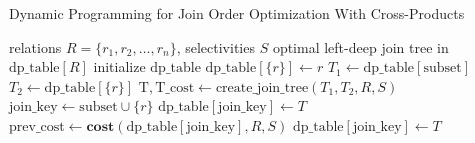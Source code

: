 \begin{algorithm}
\caption{Dynamic Programming for Join Order Optimization With Cross-Products}
\label{alg:dp-join-order}
\begin{algorithmic}[1]
\Require relations $R = \{r_1, r_2, \dots, r_n\}$, selectivities $S$
\Ensure optimal left-deep join tree in $\text{dp\_table}[R]$
\State initialize $\text{dp\_table}$
    \State $\text{dp\_table}[\{r\}] \gets r$ 
\EndFor
{} 
             
                \State $T_1 \gets \text{dp\_table}[\text{subset}]$
                \State $T_2 \gets \text{dp\_table}[\{r\}]$
                \State $\text{T}, \text{T\_cost} \gets \text{create\_join\_tree}(T_1, T_2, R, S)$
                \State $\text{join\_key} \gets \text{subset} \cup \{r\}$
                    \State $\text{dp\_table}[\text{join\_key}] \gets T$ 
                \EndIf
                    \State $\text{prev\_cost} \gets \textbf{cost}(\text{dp\_table}[\text{join\_key}], R, S)$
                        \State $\text{dp\_table}[\text{join\_key}] \gets T$ 
                    \EndIf
                \EndIf
            \EndFor
        \EndIf
    \EndFor
\EndFor
\end{algorithmic}
\end{algorithm}